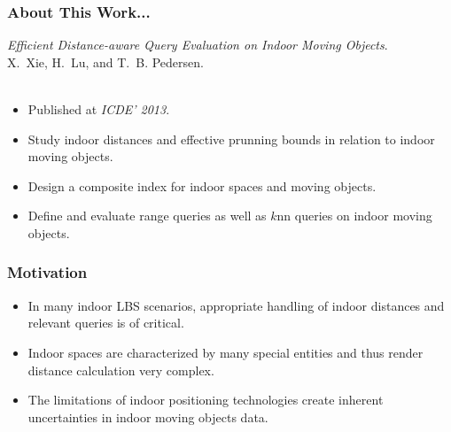 \begin{frame}
\frametitle{About This Work...}

\emph{Efficient Distance-aware Query Evaluation on Indoor Moving Objects}.~\cite{DBLP:conf/icde/XieLP13} \\
X.~Xie, H.~Lu, and T.~B. Pedersen.\\~\\

\begin{itemize}
  \item Published at \emph{ICDE' 2013}.
  \item Study indoor distances and effective prunning bounds in relation to indoor moving objects.
  \item Design a composite index for indoor spaces and moving objects.
  \item Define and evaluate range queries as well as $k$nn queries on indoor moving objects.
\end{itemize}

\end{frame}


\begin{frame}
\frametitle{Motivation}

\begin{itemize}
  \item In many indoor LBS scenarios, appropriate handling of indoor distances and relevant queries is of critical.

  \item Indoor spaces are characterized by many special entities and thus render distance calculation very complex.

  \item The limitations of indoor positioning technologies create inherent uncertainties in indoor moving objects data.

\end{itemize}

\end{frame}


